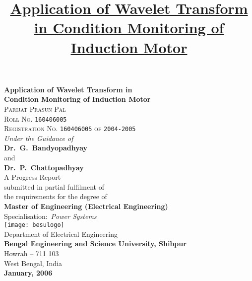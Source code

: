 \documentclass[a4paper,11pt]{article}
\title{\underline{\large{Application of Wavelet Transform in Condition Monitoring of Induction Motor}}}
\date{}
\author{}
\begin{document}
\begin{titlepage}
\begin{center}
{\huge \textbf{Application of Wavelet Transform in}}\\
\vspace{3.5pt}
{\huge \textbf{Condition Monitoring of Induction Motor}}\\
\vspace{0.5in}
{\LARGE \textsc{Parijat Prasun Pal}}\\
\vspace{3.5pt}
{\Large \textsc{Roll No.} \texttt{160406005}}\\
\vspace{3pt}
{\Large \textsc{Registration No.} \texttt{160406005} \textsc{of} \texttt{2004-2005}}\\
\vspace{0.5in}
{\large \textit{Under the Guidance of}}\\
\vspace{5pt}
{\Large \textbf{Dr.~G.~Bandyopadhyay}}\\
\vspace{3pt}
{\large and}\\
\vspace{3pt}
{\Large \textbf{Dr.~P.~Chattopadhyay}}\\
\vspace{0.75in}
{\Large A Progress Report}\\
\vspace{3pt}
\Large{submitted in partial fulfilment of}\\
\vspace{3pt}
\Large{the requirements for the degree of}\\
\vspace{4.5pt}
{\Large \textbf{Master of Engineering (Electrical Engineering)}}\\
\vspace{3.5pt}
{\Large Specialisation:~\textit{Power Systems}}\\
\vspace{0.5in}
\texttt{[image: besulogo]}\\
\vspace{0.5in}
{\Large \textsf{Department of Electrical Engineering}}\\
\vspace{3.5pt}
{\Large \textbf{Bengal Engineering and Science University, Shibpur}}\\
\vspace{3.5pt}
{\Large Howrah -- 711 103}\\
\vspace{3.5pt}
{\Large West Bengal, India}\\
\vfill
{\Large \textbf{January, 2006}} 
\end{center}
\end{titlepage}
\end{document}
